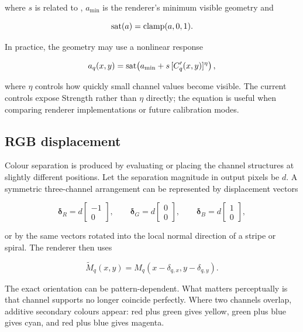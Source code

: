 where $s$ is related to , $a_{\min}$ is the renderer's minimum visible geometry and

\begin{equation}
\operatorname{sat}(a)=\operatorname{clamp}(a,0,1).
\end{equation}

In practice, the geometry may use a nonlinear response

\begin{equation}
a_q(x,y)=\operatorname{sat}\!\left(a_{\min}+s\,[C'_q(x,y)]^{\eta}\right),
\label{eq:gamma}
\end{equation}

where $\eta$ controls how quickly small channel values become visible. The current controls expose Strength rather than $\eta$ directly; the equation is useful when comparing renderer implementations or future calibration modes.

\subsection{RGB displacement}

Colour separation is produced by evaluating or placing the channel structures at slightly different positions. Let the separation magnitude in output pixels be $d$. A symmetric three-channel arrangement can be represented by displacement vectors

\begin{equation}
\boldsymbol{\delta}_R=d\begin{bmatrix}-1\\0\end{bmatrix},\qquad
\boldsymbol{\delta}_G=d\begin{bmatrix}0\\0\end{bmatrix},\qquad
\boldsymbol{\delta}_B=d\begin{bmatrix}1\\0\end{bmatrix},
\label{eq:rgbshift}
\end{equation}

or by the same vectors rotated into the local normal direction of a stripe or spiral. The renderer then uses

\begin{equation}
\widetilde{M}_q(x,y)=M_q\!\left(x-\delta_{q,x},y-\delta_{q,y}\right).
\end{equation}

The exact orientation can be pattern-dependent. What matters perceptually is that channel supports no longer coincide perfectly. Where two channels overlap, additive secondary colours appear: red plus green gives yellow, green plus blue gives cyan, and red plus blue gives magenta.

